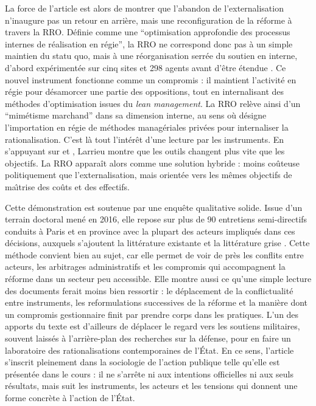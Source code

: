 \documentclass[12pt,a4paper]{article}
\begin{document}
La force de l'article est alors de montrer que l'abandon de l'externalisation n'inaugure pas un retour en arri\`ere, mais une reconfiguration de la r\'eforme \`a travers la RRO. D\'efinie comme une ``optimisation approfondie des processus internes de r\'ealisation en r\'egie'', la RRO ne correspond donc pas \`a un simple maintien du statu quo, mais \`a une r\'eorganisation serr\'ee du soutien en interne, d'abord exp\'eriment\'ee sur cinq sites et 298 agents avant d'\^etre \'etendue \parencite[p.~8]{Larrieu2018NPMSoutiensArmees}. Ce nouvel instrument fonctionne comme un compromis : il maintient l'activit\'e en r\'egie pour d\'esamorcer une partie des oppositions, tout en internalisant des m\'ethodes d'optimisation issues du \emph{lean management}. La RRO rel\`eve ainsi d'un ``mim\'etisme marchand'' dans sa dimension interne, au sens o\`u \textcite{Larrieu2024DefenseNPM} d\'esigne l'importation en r\'egie de m\'ethodes manag\'eriales priv\'ees pour internaliser la rationalisation. C'est l\`a tout l'int\'er\^et d'une lecture par les instruments. En s'appuyant sur \textcite{LascoumesLeGales2004GouvernerParLesInstruments} et \textcite{Bezes2009ReinventerEtat}, Larrieu montre que les outils changent plus vite que les objectifs. La RRO appara\^it alors comme une solution hybride : moins co\^uteuse politiquement que l'externalisation, mais orient\'ee vers les m\^emes objectifs de ma\^\i trise des co\^uts et des effectifs.

Cette d\'emonstration est soutenue par une enqu\^ete qualitative solide. Issue d'un terrain doctoral men\'e en 2016, elle repose sur plus de 90 entretiens semi-directifs conduits \`a Paris et en province avec la plupart des acteurs impliqu\'es dans ces d\'ecisions, auxquels s'ajoutent la litt\'erature existante et la litt\'erature grise \parencite{Larrieu2018NPMSoutiensArmees}. Cette m\'ethode convient bien au sujet, car elle permet de voir de pr\`es les conflits entre acteurs, les arbitrages administratifs et les compromis qui accompagnent la r\'eforme dans un secteur peu accessible. Elle montre aussi ce qu'une simple lecture des documents ferait moins bien ressortir : le d\'eplacement de la conflictualit\'e entre instruments, les reformulations successives de la r\'eforme et la mani\`ere dont un compromis gestionnaire finit par prendre corps dans les pratiques. L'un des apports du texte est d'ailleurs de d\'eplacer le regard vers les soutiens militaires, souvent laiss\'es \`a l'arri\`ere-plan des recherches sur la d\'efense, pour en faire un laboratoire des rationalisations contemporaines de l'\'Etat. En ce sens, l'article s'inscrit pleinement dans la sociologie de l'action publique telle qu'elle est pr\'esent\'ee dans le cours : il ne s'arr\^ete ni aux intentions officielles ni aux seuls r\'esultats, mais suit les instruments, les acteurs et les tensions qui donnent une forme concr\`ete \`a l'action de l'\'Etat.
\end{document}
